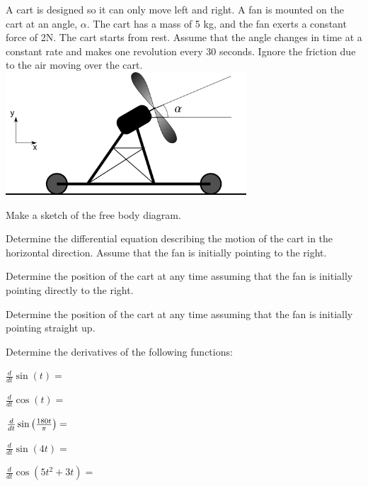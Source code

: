 \begin{problem}
\end{problem}


\begin{problem}
\item A cart is designed so it can only move left and right. A fan is
  mounted on the cart at an angle, $\alpha$. The cart has a mass of 5
  kg, and the fan exerts a constant force of 2N. The cart starts from
  rest. Assume that the angle changes in time at a constant rate and
  makes one revolution every 30 seconds. Ignore the friction due to
  the air moving over the cart. \\
  \includegraphics[width=9cm]{ink/week6/airCart}
  \begin{subproblem}
    \item Make a sketch of the free body diagram.
      \vfill
    \item Determine the differential equation describing the motion of
      the cart in the horizontal direction. Assume that the fan is
      initially pointing to the right.
      \vfill
      \clearpage
    \item Determine the position of the cart at any time assuming that
      the fan is initially pointing directly to the right.
      \vfill
    \item Determine the position of the cart at any time assuming that
      the fan is initially pointing straight up.
      \vfill
  \end{subproblem}

  \clearpage

\item Determine the derivatives of the following functions:
  \begin{subproblem}
    \item $\frac{d}{dt} \sin(t) = $
      \vfill
    \item $\frac{d}{dt} \cos(t) = $
      \vfill
    \item $\frac{d}{dt} \sin\left( \frac{180 t}{\pi}  \right) = $
      \vfill
    \item $\frac{d}{dt} \sin(4t) = $
      \vfill
    \item $\frac{d}{dt} \cos(5t^2+3t) = $
      \vfill
  \end{subproblem}


\end{problem}
